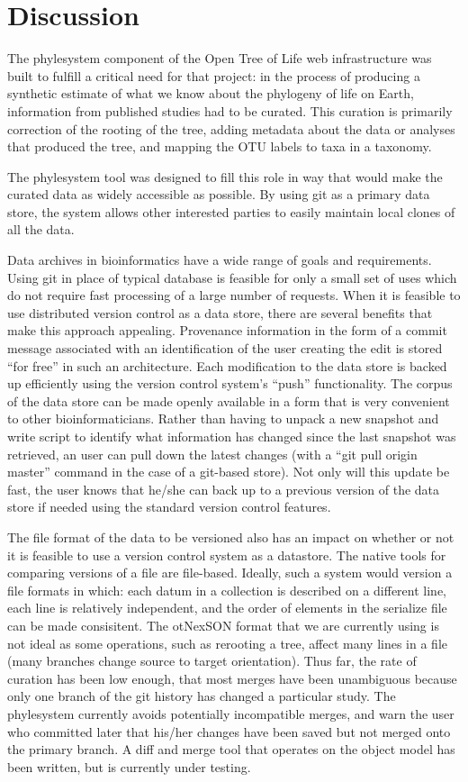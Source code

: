 \documentclass{bioinfo}
\newcommand{\ps}{phylesystem\xspace}
\newcommand{\otol}{Open Tree of Life\xspace}
\newcommand{\nexson}{otNexSON\xspace}
\begin{document}
\section{Discussion}
The \ps component of the \otol web infrastructure was built to fulfill a critical need for that
    project: in the process of producing a synthetic estimate of what we know about the phylogeny
    of life on Earth, information from published studies had to be curated.
This curation is primarily correction of the rooting of the tree, adding metadata about the data
    or analyses that produced the tree, and mapping the OTU labels to taxa in a taxonomy.

The \ps tool was designed to fill this role in way that would make the curated data as widely accessible
    as possible.
By using git as a primary data store, the system allows other interested parties to easily maintain
    local clones of all the data.

Data archives in bioinformatics have a wide range of goals and requirements.
Using git in place of typical database is feasible for only a small set of uses which do not require
    fast processing of a large number of requests.
When it is feasible to use distributed version control as a data store, there are several benefits
    that make this approach appealing.
Provenance information in the form of a commit message associated with an identification of the 
    user creating the edit is stored ``for free'' in such an architecture.
Each modification to the data store is backed up efficiently using the version control system's ``push'' functionality.
The corpus of the data store can be made openly available in a form that is very convenient to
    other bioinformaticians.
Rather than having to unpack a new snapshot and write script to identify
    what information has changed since the last snapshot was retrieved, an user can pull down
    the latest changes (with a ``git pull origin master'' command in the case of a git-based store).
Not only will this update be fast, the user knows that he/she can back up to a previous version of the 
    data store if needed using the standard version control features.

The file format of the data to be versioned also has an impact on whether or not it is feasible
    to use a version control system as a datastore.
The native tools for comparing versions of a file are file-based.
Ideally, such a system would version a file formats in which:
    each datum in a collection is described on a different line, 
    each line is relatively independent, and 
    the order of elements in the serialize file can be made consisitent.
The \nexson format that we are currently using is not ideal as some operations, such as rerooting a tree,
    affect many lines in a file (many branches change source to target orientation).
Thus far, the rate of curation has been low enough, that most merges have been unambiguous because
    only one branch of the git history has changed a particular study.
The \ps currently avoids potentially incompatible merges, and warn the user who committed later that his/her
    changes have been saved but not merged onto the primary branch.
A diff and merge tool that operates on the object model has been written, but is currently under testing.
\end{document}
